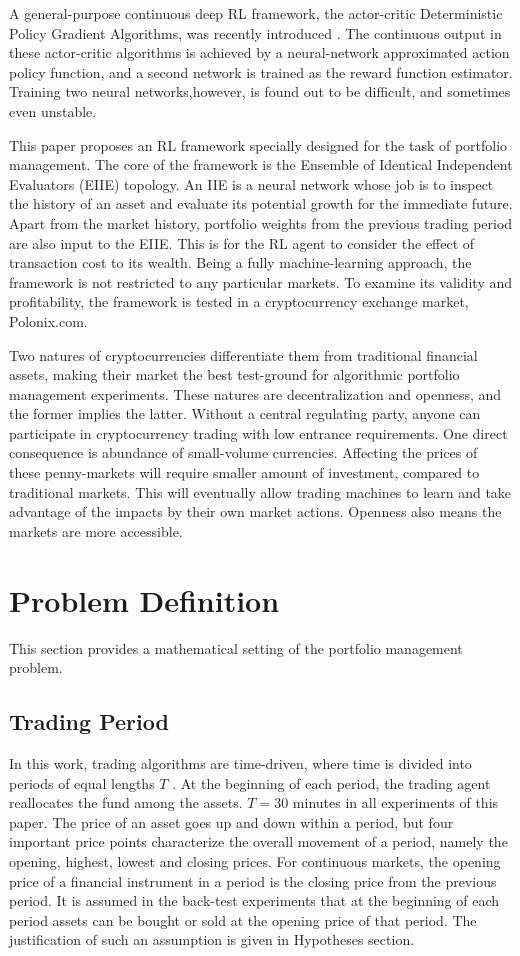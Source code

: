 \documentclass[journal,onecolumn]{IEEEtran}
\begin{document}
A general-purpose continuous deep RL framework, the actor-critic Deterministic Policy Gradient Algorithms, was recently introduced \cite{Silver2014}. The continuous output in these actor-critic
algorithms is achieved by a neural-network approximated action policy function, and a second network is trained as the reward function estimator. Training two neural networks,however, is found out to be difficult, and sometimes even unstable.

This paper proposes an RL framework specially designed for the task of portfolio management. The core of the framework is the Ensemble of Identical Independent Evaluators (EIIE) topology. An IIE is a neural network whose job is to inspect the history of an asset and evaluate its potential growth for the immediate future. Apart from the market history, portfolio weights from the previous trading period are also input to the EIIE. This is for the RL agent to consider the effect of transaction cost to its wealth. Being a fully machine-learning approach, the framework is not restricted to any particular markets. To examine its validity and profitability, the framework is tested in a cryptocurrency exchange market, Polonix.com.

Two natures of cryptocurrencies differentiate them from traditional financial assets, making their market the best test-ground for algorithmic portfolio management experiments. These natures are decentralization and openness, and the former implies the latter. Without a central regulating party, anyone can participate in cryptocurrency trading with low entrance requirements. One direct consequence is abundance of small-volume currencies. Affecting the prices of these penny-markets will require smaller amount of investment, compared to traditional markets. This will eventually allow trading machines to learn and take advantage of the impacts by their own market actions. Openness also means the markets are more accessible. 
\section{Problem Definition}
This section provides a mathematical setting of the portfolio
management problem.
\subsection{Trading Period}
In this work, trading algorithms are time-driven, where time is divided into periods of equal
lengths $T$ . At the beginning of each period, the trading agent reallocates the fund among the assets. $T = 30$ minutes in all experiments of this paper. The price of an asset goes up and
down within a period, but four important price points characterize the overall movement of a period, namely the opening, highest, lowest and closing prices. For continuous markets, the opening price of a financial instrument in a period is the closing price from the previous period. It is assumed in the back-test experiments that
at the beginning of each period assets can be bought or sold at the opening price of that period. The justification of such an assumption is given in Hypotheses section.
\end{document}
